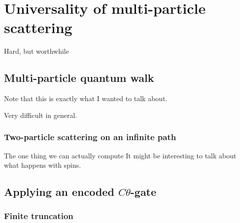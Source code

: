 \documentclass[../thesis-main/thesis-main]{subfiles}
\begin{document}
\chapter{Universality of multi-particle scattering}


Hard, but worthwhile



\section{Multi-particle quantum walk}

Note that this is exactly what I wanted to talk about.

Very difficult in general.

\subsection{Two-particle scattering on an infinite path}

The one thing we can actually compute
It might be interesting to talk about what happens with spins.




\section{Applying an encoded $C\theta$-gate}

\subsection{Finite truncation}
\end{document}
